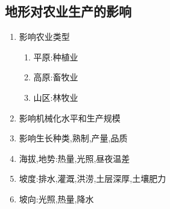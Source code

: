 \documentclass[a4paper]{article}
\begin{document}
    \subsection{地形对农业生产的影响}
    \begin{enumerate}
        \item 影响农业类型
        \begin{enumerate}
            \item 平原:种植业
            \item 高原:畜牧业
            \item 山区:林牧业
        \end{enumerate}
        \item 影响机械化水平和生产规模
        \item 影响生长种类,熟制,产量,品质
        \item 海拔,地势:热量,光照,昼夜温差
        \item 坡度:排水,灌溉,洪涝,土层深厚,土壤肥力
        \item 坡向:光照,热量,降水
    \end{enumerate}
\end{document}
